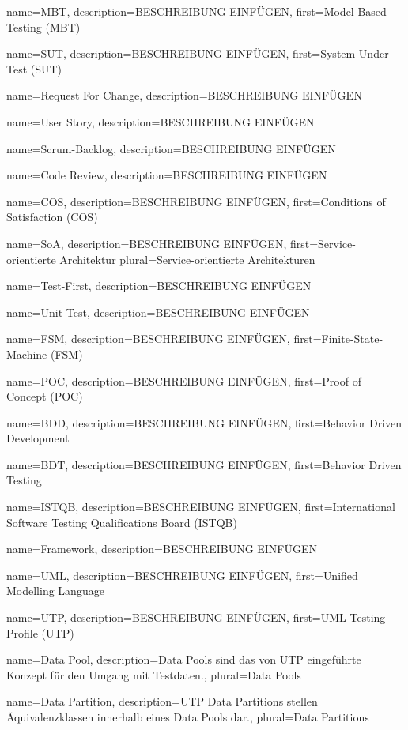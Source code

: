  {
	name={MBT},
	description={BESCHREIBUNG EINFÜGEN},
	first={Model Based Testing (MBT)}
}

 {
	name={SUT},
	description={BESCHREIBUNG EINFÜGEN},
	first={System Under Test (SUT)}
}

 {
	name={Request For Change},
	description={BESCHREIBUNG EINFÜGEN}
}

 {
	name={User Story},
	description={BESCHREIBUNG EINFÜGEN}
}

 {
	name={Scrum-Backlog},
	description={BESCHREIBUNG EINFÜGEN}
}

 {
	name={Code Review},
	description={BESCHREIBUNG EINFÜGEN}
}

 {
	name={COS},
	description={BESCHREIBUNG EINFÜGEN},
	first={Conditions of Satisfaction (COS)}
}

 {
	name={SoA},
	description={BESCHREIBUNG EINFÜGEN},
	first={Service-orientierte Architektur}
	plural={Service-orientierte Architekturen}
}

 {
	name={Test-First},
	description={BESCHREIBUNG EINFÜGEN}
}

 {
	name={Unit-Test},
	description={BESCHREIBUNG EINFÜGEN}
}

 {
	name={FSM},
	description={BESCHREIBUNG EINFÜGEN},
	first={Finite-State-Machine (FSM)}
}

 {
	name={POC},
	description={BESCHREIBUNG EINFÜGEN},
	first={Proof of Concept (POC)}
}

 {
	name={BDD},
	description={BESCHREIBUNG EINFÜGEN},
	first={Behavior Driven Development}
}

 {
	name={BDT},
	description={BESCHREIBUNG EINFÜGEN},
	first={Behavior Driven Testing}
}

 {
	name={ISTQB},
	description={BESCHREIBUNG EINFÜGEN},
	first={International Software Testing Qualifications Board (ISTQB)}
}

 {
	name={Framework},
	description={BESCHREIBUNG EINFÜGEN}
}

 {
	name={UML},
	description={BESCHREIBUNG EINFÜGEN},
	first={Unified Modelling Language}
}

 {
	name={UTP},
	description={BESCHREIBUNG EINFÜGEN},
	first={UML Testing Profile (UTP)}
}

 {
	name={Data Pool},
	description={Data Pools sind das von UTP eingeführte Konzept für den Umgang mit Testdaten.},
	plural={Data Pools}
}

 {
	name={Data Partition},
	description={UTP Data Partitions stellen Äquivalenzklassen innerhalb eines Data Pools dar.},
	plural={Data Partitions}
}
